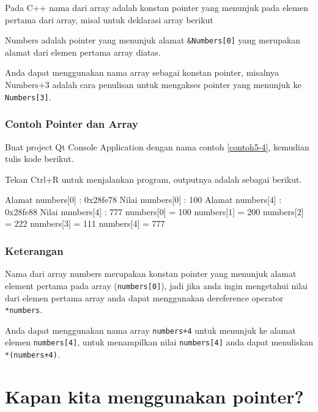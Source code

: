Pada C++ nama dari array adalah konstan pointer yang menunjuk pada
elemen pertama dari array, misal untuk deklarasi array berikut



Numbers adalah pointer yang menunjuk alamat \texttt{\&Numbers{[}0{]}}
yang merupakan alamat dari elemen pertama array diatas.

Anda dapat menggunakan nama array sebagai konstan pointer, misalnya
Numbers+3 adalah cara penulisan untuk mengakses pointer yang menunjuk ke
\texttt{Numbers{[}3{]}}.

\subsubsection*{Contoh  Pointer dan Array}

Buat project Qt Console Application dengan nama contoh \ref{contoh5-4}, kemudian tulis
kode berikut.



Tekan Ctrl+R untuk menjalankan program, outputnya adalah sebagai
berikut.

\begin{lcverbatim}
Alamat numbers[0] : 0x28fe78
Nilai numbers[0] : 100
Alamat numbers[4] : 0x28fe88
Nilai numbers[4] : 777
numbers[0] = 100
numbers[1] = 200
numbers[2] = 222
numbers[3] = 111
numbers[4] = 777
\end{lcverbatim}

\subsubsection*{Keterangan}

Nama dari array numbers merupakan konstan pointer yang menunjuk alamat
element pertama pada array (\texttt{numbers{[}0{]}}), jadi jika anda
ingin mengetahui nilai dari elemen pertama array anda dapat menggunakan
dereference operator \texttt{*numbers}.

Anda dapat menggunakan nama array \texttt{numbers+4} untuk menunjuk ke
alamat elemen \texttt{numbers{[}4{]}}, untuk menampilkan nilai
\texttt{numbers{[}4{]}} anda dapat menuliskan \texttt{*(numbers+4)}.

\section{Kapan kita menggunakan pointer?}\label{kapan-kita-menggunakan-pointer}

